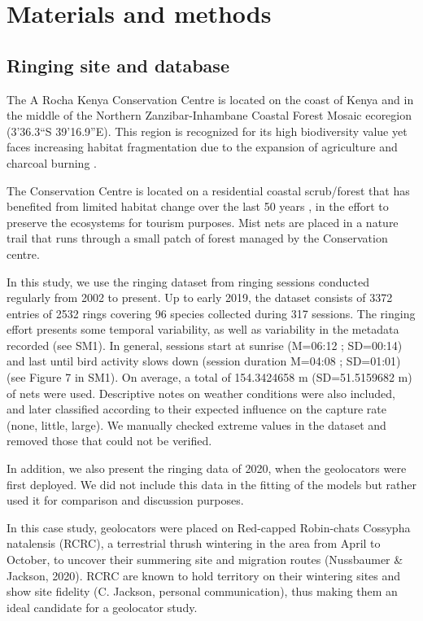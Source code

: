 \documentclass[]{interact}
\theoremstyle{plain}%
\theoremstyle{definition}
\theoremstyle{remark}
\begin{document}
\hypertarget{materials-and-methods}{%
\section{Materials and methods}\label{materials-and-methods}}

\hypertarget{ringing-site-and-database}{%
\subsection{Ringing site and database}\label{ringing-site-and-database}}

The A Rocha Kenya Conservation Centre is located on the coast of Kenya
and in the middle of the Northern Zanzibar-Inhambane Coastal Forest
Mosaic ecoregion (3'36.3``S 39'16.9''E). This region
is recognized for its high biodiversity value \citep{Marris2010} yet
faces increasing habitat fragmentation due to the expansion of
agriculture and charcoal burning \citep{Burgess2000CoastalFO}.

The Conservation Centre is located on a residential coastal scrub/forest
that has benefited from limited habitat change over the last 50 years
\citep{Alemayehu2016}, in the effort to preserve the ecosystems for
tourism purposes. Mist nets are placed in a nature trail that runs
through a small patch of forest managed by the Conservation centre.

In this study, we use the ringing dataset from ringing sessions
conducted regularly from 2002 to present. Up to early 2019, the dataset
consists of 3372 entries of 2532 rings covering 96 species collected
during 317 sessions. The ringing effort presents some temporal
variability, as well as variability in the metadata recorded (see SM1).
In general, sessions start at sunrise (M=06:12 ; SD=00:14) and last
until bird activity slows down (session duration M=04:08 ; SD=01:01)
(see Figure 7 in SM1). On average, a total of 154.3424658 m
(SD=51.5159682 m) of nets were used. Descriptive notes on weather
conditions were also included, and later classified according to their
expected influence on the capture rate (none, little, large). We
manually checked extreme values in the dataset and removed those that
could not be verified.

In addition, we also present the ringing data of 2020, when the
geolocators were first deployed. We did not include this data in the
fitting of the models but rather used it for comparison and discussion
purposes.

In this case study, geolocators were placed on Red-capped Robin-chats
Cossypha natalensis (RCRC), a terrestrial thrush wintering in the area
from April to October, to uncover their summering site and migration
routes (Nussbaumer \& Jackson, 2020). RCRC are known to hold territory
on their wintering sites and show site fidelity (C. Jackson, personal
communication), thus making them an ideal candidate for a geolocator
study.
\end{document}
